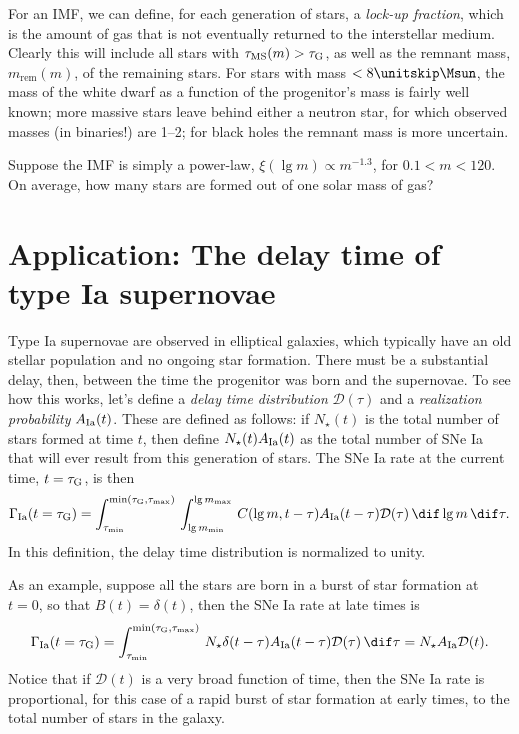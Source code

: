 For an IMF, we can define, for each generation of stars, a \emph{lock-up fraction}, which is the amount of gas that is not eventually returned to the interstellar medium. Clearly this will include all stars with $\tau_{\mathrm{MS}}(m) > \tau_{\mathrm{G}}$, as well as the remnant mass, $m_{\mathrm{rem}}(m)$, of the remaining stars.  For stars with mass $< 8\nsp\Msun$, the mass of the white dwarf as a function of the progenitor's mass is fairly well known; more massive stars leave behind either a neutron star, for which observed masses (in binaries!) are 1--2\nsp\Msun; for black holes the remnant mass is more uncertain.

\begin{exercisebox}
Suppose the IMF is simply a power-law, $\xi(\lg m) \propto m^{-1.3}$, for $0.1 < m < 120$. On average, how many stars are formed out of one solar mass of gas?
\end{exercisebox}

\section{Application: The delay time of type Ia supernovae}\label{s.delay-time}

Type Ia supernovae are observed in elliptical galaxies, which typically have an old stellar population and no ongoing star formation.  There must be a substantial delay, then, between the time the progenitor was born and the supernovae.  To see how this works, let's define a \emph{delay time distribution} $\mathcal{D}(\tau)$ and a \emph{realization probability} $A_{\mathrm{Ia}}(t)$. These are defined as follows: if $N_{\star}(t)$ is the total number of stars formed at time $t$, then define $N_{\star}(t)A_{\mathrm{Ia}}(t)$ as the total number of SNe Ia that will ever result from this generation of stars. The SNe Ia rate at the current time, $t =\tau_{\mathrm{G}}$, is then
\begin{equation}\label{e.Ia-rate}
\Gamma_{\mathrm{Ia}}(t=\tauG) = \int_{\tau_{\min}}^{\min(\tauG,\tau_{\max})}\,\int_{\lg m_{\min}}^{\lg m_{\max}}\,C(\lg m,t-\tau) \AIa(t-\tau) \mathcal{D}(\tau)\,\dif\lg m\,\dif\tau.
\end{equation}
In this definition, the delay time distribution is normalized to unity.

As an example, suppose all the stars are born in a burst of star formation at $t=0$, so that $B(t) = \delta(t)$, then the SNe Ia rate at late times is
\[
\Gamma_{\mathrm{Ia}}(t=\tauG) = \int_{\tau_{\min}}^{\min(\tauG,\tau_{\max})}\,N_{\star}\delta(t-\tau) \AIa(t-\tau) \mathcal{D}(\tau)\,\dif\tau = N_{\star}\AIa\mathcal{D}(t).
\]
Notice that if $\mathcal{D}(t)$ is a very broad function of time, then the SNe Ia rate is proportional, for this case of a rapid burst of star formation at early times, to the total number of stars in the galaxy.


